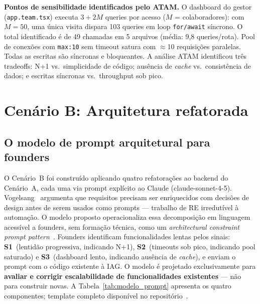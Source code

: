 \documentclass[sigconf]{acmart}
\begin{document}
\textbf{Pontos de sensibilidade identificados pelo ATAM.} O dashboard do gestor
(\texttt{app.team.tsx}) executa $3+2M$ queries por acesso ($M$ = colaboradores):
com $M=50$, uma única visita dispara 103 queries em loop \texttt{for/await}
síncrono. O total identificado é de 49 chamadas em 5 arquivos (média: 9,8
queries/rota). Pool de conexões com \texttt{max:10} sem timeout satura com
$\approx$10 requisições paralelas. Todas as escritas são síncronas e bloqueantes.
A análise ATAM identificou três tradeoffs: N+1 vs.\ simplicidade de código;
ausência de \textit{cache} vs.\ consistência de dados; e escritas síncronas
vs.\ throughput sob pico.

\section{Cenário B: Arquitetura refatorada}

\subsection{O modelo de prompt arquitetural para founders}
\label{subsec:modelo_prompt}

O Cenário~B foi construído aplicando quatro refatorações ao backend do Cenário~A,
cada uma via prompt explícito ao Claude (claude-sonnet-4-5). Vogelsang~\cite{Vogelsang2024}
argumenta que requisitos precisam ser enriquecidos com decisões de design antes de
serem usados como prompts --- trabalho de RE irredutível à automação. O modelo
proposto operacionaliza essa decomposição em linguagem acessível a founders, sem
formação técnica, como um \textit{architectural constraint prompt pattern}~\cite{White2023}.
Founders identificam funcionalidades lentas pelos sinais: \textbf{S1}~(lentidão
progressiva, indicando N+1), \textbf{S2}~(timeouts sob pico, indicando pool saturado)
e \textbf{S3}~(dashboard lento, indicando ausência de \textit{cache}), e enviam
o prompt com o código existente à IAG. O modelo é projetado exclusivamente para
\textbf{avaliar e corrigir escalabilidade de funcionalidades existentes} --- não
para construir novas. A Tabela~\ref{tab:modelo_prompt} apresenta os quatro
componentes; template completo disponível no repositório~\cite{WelcomeNavigator2025}.
\end{document}
